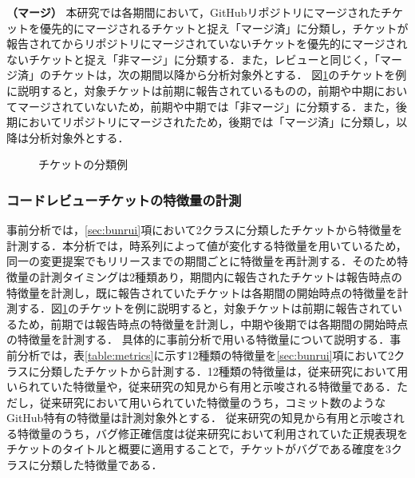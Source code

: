\documentclass[submit]{ipsj}
\begin{document}
\textbf{（マージ）} 本研究では各期間において，GitHubリポジトリにマージされたチケットを優先的にマージされるチケットと捉え「マージ済」に分類し，チケットが報告されてからリポジトリにマージされていないチケットを優先的にマージされないチケットと捉え「非マージ」に分類する．また，レビューと同じく，「マージ済」のチケットは，次の期間以降から分析対象外とする．
図\ref{fig:labeling}のチケットを例に説明すると，対象チケットは前期に報告されているものの，前期や中期においてマージされていないため，前期や中期では「非マージ」に分類する．また，後期においてリポジトリにマージされたため，後期では「マージ済」に分類し，以降は分析対象外とする．

\begin{figure}[h]
\begin{center}
\caption{チケットの分類例}
\label{fig:labeling}
\end{center}
\end{figure}


\subsubsection{コードレビューチケットの特徴量の計測}\label{sec:metrics}
事前分析では，\ref{sec:bunrui}項において2クラスに分類したチケットから特徴量を計測する．本分析では，時系列によって値が変化する特徴量を用いているため，同一の変更提案でもリリースまでの期間ごとに特徴量を再計測する．そのため特徴量の計測タイミングは2種類あり，期間内に報告されたチケットは報告時点の特徴量を計測し，既に報告されていたチケットは各期間の開始時点の特徴量を計測する．図\ref{fig:labeling}のチケットを例に説明すると，対象チケットは前期に報告されているため，前期では報告時点の特徴量を計測し，中期や後期では各期間の開始時点の特徴量を計測する．
具体的に事前分析で用いる特徴量について説明する．事前分析では，表\ref{table:metrics}に示す12種類の特徴量を\ref{sec:bunrui}項において2クラスに分類したチケットから計測する．12種類の特徴量は，従来研究\cite{prioritizer}において用いられていた特徴量や，従来研究\cite{release_merge}\cite{review1}の知見から有用と示唆される特徴量である．ただし，従来研究\cite{prioritizer}において用いられていた特徴量のうち，コミット数のようなGitHub特有の特徴量は計測対象外とする．
従来研究\cite{release_merge}\cite{review1}の知見から有用と示唆される特徴量のうち，バグ修正確信度は従来研究\cite{bug}において利用されていた正規表現をチケットのタイトルと概要に適用することで，チケットがバグである確度を3クラスに分類した特徴量である．
\end{document}
